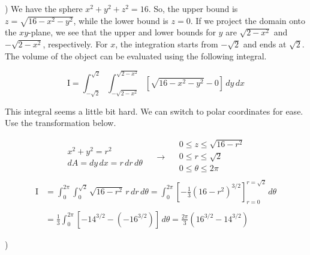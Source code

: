 \documentclass{article}
\begin{document}
) We have the sphere $x^2+y^2+z^2=16$. So, the upper bound is $z=\sqrt{16-x^2-y^2}$, while the lower bound is $z=0$. If we project the domain onto the $xy$-plane, we see that the upper and lower bounds for $y$ are $\sqrt{2-x^2}$ and $-\sqrt{2-x^2}$, respectively. For $x$, the integration starts from $-\sqrt2$ and ends at $\sqrt2$. The volume of the object can be evaluated using the following integral.

\newpage

\begin{equation*}\mathrm{I}=\int_{-\sqrt2}^{\sqrt2}\int_{-\sqrt{2-x^2}}^{\sqrt{2-x^2}}\left[\sqrt{16-x^2-y^2}-0 \right]\,dy\,dx\end{equation*}

\hfill

\noindent This integral seems a little bit hard. We can switch to polar coordinates for ease. Use the transformation below.

\[
\begin{array}{c}
x^2+y^2=r^2\\
dA=dy\,dx =r\,dr\,d\theta
\end{array}\quad\rightarrow\quad
\begin{array}{c}
0\leq z\leq\sqrt{16-r^2}\\
0\leq r\leq \sqrt2\\
0\leq\theta\leq 2\pi\\
\end{array} 
\]
\begin{align*}\mathrm{I}&=\int_{0}^{2\pi}\int_{0}^{\sqrt{2}}\sqrt{16-r^2}\,r\,dr\,d\theta=\int_{0}^{2\pi}\left[-\frac13\left(16-r^2\right)^{3/2}\right]_{r=0}^{r=\sqrt2}\,d\theta\\\\&=\frac13\int_0^{2\pi}\left[-14^{3/2}-\left(-16^{3/2}\right)\right]\,d\theta=\boxed{\frac{2\pi}{3}\left(16^{3/2}-14^{3/2}\right)}
\end{align*}

\hfill

)

\hfill
\end{document}
